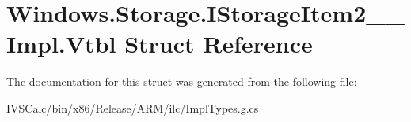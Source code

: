 \hypertarget{struct_windows_1_1_storage_1_1_i_storage_item2_____impl_1_1_vtbl}{}\section{Windows.\+Storage.\+I\+Storage\+Item2\+\_\+\+\_\+\+Impl.\+Vtbl Struct Reference}
\label{struct_windows_1_1_storage_1_1_i_storage_item2_____impl_1_1_vtbl}


The documentation for this struct was generated from the following file\+:\begin{DoxyCompactItemize}
\item 
I\+V\+S\+Calc/bin/x86/\+Release/\+A\+R\+M/ilc/Impl\+Types.\+g.\+cs\end{DoxyCompactItemize}
